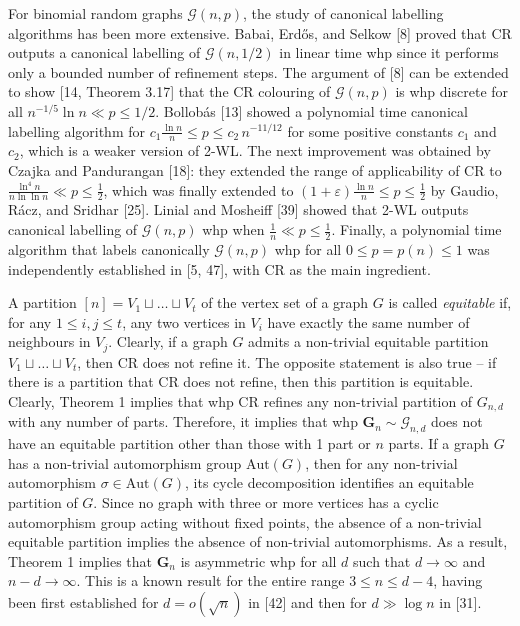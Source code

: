 For binomial random graphs $\mathcal{G}(n,p)$, the study of canonical labelling algorithms has been more extensive. Babai, Erdős, and Selkow [8] proved that CR outputs a canonical labelling of $\mathcal{G}(n,1/2)$ in linear time whp since it performs only a bounded number of refinement steps. The argument of [8] can be extended to show [14, Theorem 3.17] that the CR colouring of $\mathcal{G}(n,p)$ is whp discrete for all $n^{-1/5}\ln n\ll p\leq 1/2$. Bollobás [13] showed a polynomial time canonical labelling algorithm for $c_{1}\frac{\ln n}{n}\leq p\leq c_{2}\,n^{-11/12}$ for some positive constants $c_{1}$ and $c_{2}$, which is a weaker version of 2-WL. The next improvement was obtained by Czajka and Pandurangan [18]: they extended the range of applicability of CR to $\frac{\ln^{4}n}{n\ln\ln n}\ll p\leq\frac{1}{2}$, which was finally extended to $(1+\varepsilon)\frac{\ln n}{n}\leq p\leq\frac{1}{2}$ by Gaudio, Rácz, and Sridhar [25]. Linial and Mosheiff [39] showed that 2-WL outputs canonical labelling of $\mathcal{G}(n,p)$ whp when $\frac{1}{n}\ll p\leq\frac{1}{2}$. Finally, a polynomial time algorithm that labels canonically $\mathcal{G}(n,p)$ whp for all $0\leq p=p(n)\leq 1$ was independently established in [5, 47], with CR as the main ingredient.\par




A partition $[n]=V_{1}\sqcup\ldots\sqcup V_{t}$ of the vertex set of a graph $G$ is called \emph{equitable} if, for any $1\leq i,j\leq t$, any two vertices in $V_{i}$ have exactly the same number of neighbours in $V_{j}$. Clearly, if a graph $G$ admits a non-trivial equitable partition $V_{1}\sqcup\ldots\sqcup V_{t}$, then CR does not refine it. The opposite statement is also true – if there is a partition that CR does not refine, then this partition is equitable. Clearly, Theorem 1 implies that whp CR refines any non-trivial partition of $G_{n,d}$ with any number of parts. Therefore, it implies that whp $\mathbf{G}_{n}\sim\mathcal{G}_{n,d}$ does not have an equitable partition other than those with 1 part or $n$ parts. If a graph $G$ has a non-trivial automorphism group $\mathrm{Aut}(G)$, then for any non-trivial automorphism $\sigma\in\mathrm{Aut}(G)$, its cycle decomposition identifies an equitable partition of $G$.
Since no graph with three or more vertices has a
cyclic automorphism group acting without fixed points,
the absence of a non-trivial equitable partition implies
the absence of non-trivial automorphisms.
As a result, Theorem 1 implies that $\mathbf{G}_{n}$ is asymmetric whp for all $d$ such that $d\to\infty$ and $n-d\to\infty$. This is a known result for the entire range $3\leq n\leq d-4$, having been first established for $d=o(\sqrt{n})$ in [42] and then for $d\gg\log n$ in [31].\par





